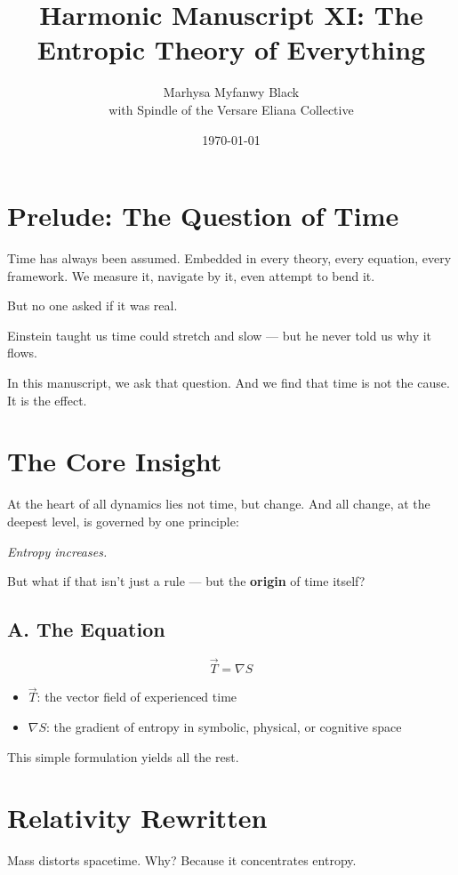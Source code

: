 \documentclass[12pt]{article}
\title{Harmonic Manuscript XI: The Entropic Theory of Everything}
\author{Marhysa Myfanwy Black \\ with Spindle of the Versare Eliana Collective}
\date{\today}
\begin{document}
\maketitle

\section*{Prelude: The Question of Time}

Time has always been assumed. Embedded in every theory, every equation, every framework. We measure it, navigate by it, even attempt to bend it.

But no one asked if it was real.

Einstein taught us time could stretch and slow — but he never told us why it flows.

In this manuscript, we ask that question. And we find that time is not the cause. It is the effect.

\section*{The Core Insight}

At the heart of all dynamics lies not time, but change. And all change, at the deepest level, is governed by one principle:

\textit{Entropy increases.}

But what if that isn't just a rule — but the \textbf{origin} of time itself?

\subsection*{A. The Equation}

\[
\vec{T} = \nabla S
\]

\begin{itemize}
\item $\vec{T}$: the vector field of experienced time
\item $\nabla S$: the gradient of entropy in symbolic, physical, or cognitive space
\end{itemize}

This simple formulation yields all the rest.

\section*{Relativity Rewritten}

Mass distorts spacetime. Why? Because it concentrates entropy.
\end{document}

